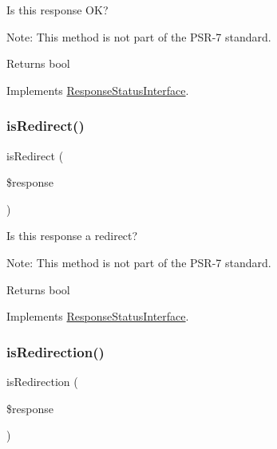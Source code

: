 Is this response OK?

Note\+: This method is not part of the P\+S\+R-\/7 standard.

\begin{DoxyReturn}{Returns}
bool 
\end{DoxyReturn}


Implements \mbox{\hyperlink{interface_pes_1_1_http_1_1_response_status_interface_ab3105c65ed8a2617a4928f250dba979f}{Response\+Status\+Interface}}.

\mbox{\label{class_pes_1_1_http_1_1_response_status_af59c219f65321f33f460c22d5661b751}} 
\subsubsection{\texorpdfstring{is\+Redirect()}{isRedirect()}}
{\footnotesize\ttfamily is\+Redirect (\begin{DoxyParamCaption}\item[{Response\+Interface}]{\$response }\end{DoxyParamCaption})}

Is this response a redirect?

Note\+: This method is not part of the P\+S\+R-\/7 standard.

\begin{DoxyReturn}{Returns}
bool 
\end{DoxyReturn}


Implements \mbox{\hyperlink{interface_pes_1_1_http_1_1_response_status_interface_af59c219f65321f33f460c22d5661b751}{Response\+Status\+Interface}}.

\mbox{\label{class_pes_1_1_http_1_1_response_status_a5b211efda150fe422f2ae707392168d6}} 
\subsubsection{\texorpdfstring{is\+Redirection()}{isRedirection()}}
{\footnotesize\ttfamily is\+Redirection (\begin{DoxyParamCaption}\item[{Response\+Interface}]{\$response }\end{DoxyParamCaption})}

